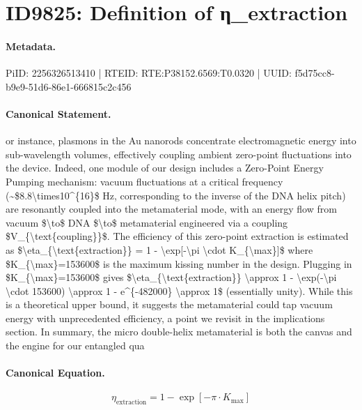 \section*{ID9825: Definition of η\_extraction}
\paragraph{Metadata.}
PiID: 2256326513410 | RTEID: RTE:P38152.6569:T0.0320 | UUID: f5d75cc8-b9e9-51d6-86e1-666815c2c456

\paragraph{Canonical Statement.}
or instance, plasmons in the Au nanorods concentrate electromagnetic energy into sub-wavelength volumes, effectively coupling ambient zero-point fluctuations into the device. Indeed, one module of our design includes a Zero-Point Energy Pumping mechanism: vacuum fluctuations at a critical frequency (\textasciitilde{}\$8.8\textbackslash{}times10\textasciicircum{}\{16\}\$ Hz, corresponding to the inverse of the DNA helix pitch) are resonantly coupled into the metamaterial mode, with an energy flow from vacuum \$\textbackslash{}to\$ DNA \$\textbackslash{}to\$ metamaterial engineered via a coupling \$V\_\{\textbackslash{}text\{coupling\}\}\$. The efficiency of this zero-point extraction is estimated as \$\textbackslash{}eta\_\{\textbackslash{}text\{extraction\}\} = 1 - \textbackslash{}exp[-\textbackslash{}pi \textbackslash{}cdot K\_\{\textbackslash{}max\}]\$ where \$K\_\{\textbackslash{}max\}=153600\$ is the maximum kissing number in the design. Plugging in \$K\_\{\textbackslash{}max\}=153600\$ gives \$\textbackslash{}eta\_\{\textbackslash{}text\{extraction\}\} \textbackslash{}approx 1 - \textbackslash{}exp(-\textbackslash{}pi \textbackslash{}cdot 153600) \textbackslash{}approx 1 - e\textasciicircum{}\{-482000\} \textbackslash{}approx 1\$ (essentially unity). While this is a theoretical upper bound, it suggests the metamaterial could tap vacuum energy with unprecedented efficiency, a point we revisit in the implications section. In summary, the micro double-helix metamaterial is both the canvas and the engine for our entangled qua

\paragraph{Canonical Equation.}
\[
\eta_{\text{extraction}} = 1 - \exp[-\pi \cdot K_{\max}]
\]


